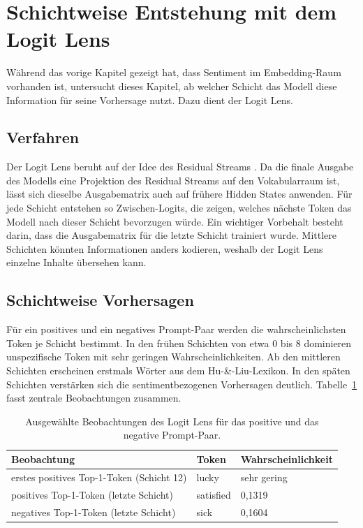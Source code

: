 \section{Schichtweise Entstehung mit dem Logit Lens}

Während das vorige Kapitel gezeigt hat, dass Sentiment im Embedding-Raum vorhanden ist, untersucht dieses Kapitel, ab welcher Schicht das Modell diese Information für seine Vorhersage nutzt. Dazu dient der Logit Lens.

\subsection{Verfahren}

Der Logit Lens beruht auf der Idee des Residual Streams \cite{nostalgebraist2020logit}. Da die finale Ausgabe des Modells eine Projektion des Residual Streams auf den Vokabularraum ist, lässt sich dieselbe Ausgabematrix auch auf frühere Hidden States anwenden. Für jede Schicht entstehen so Zwischen-Logits, die zeigen, welches nächste Token das Modell nach dieser Schicht bevorzugen würde. Ein wichtiger Vorbehalt besteht darin, dass die Ausgabematrix für die letzte Schicht trainiert wurde. Mittlere Schichten könnten Informationen anders kodieren, weshalb der Logit Lens einzelne Inhalte übersehen kann.

\subsection{Schichtweise Vorhersagen}

Für ein positives und ein negatives Prompt-Paar werden die wahrscheinlichsten Token je Schicht bestimmt. In den frühen Schichten von etwa 0 bis 8 dominieren unspezifische Token mit sehr geringen Wahrscheinlichkeiten. Ab den mittleren Schichten erscheinen erstmals Wörter aus dem Hu-\&-Liu-Lexikon. In den späten Schichten verstärken sich die sentimentbezogenen Vorhersagen deutlich. Tabelle~\ref{tab:logitlenstokens} fasst zentrale Beobachtungen zusammen.

\begin{table}[htbp]
  \centering
  \caption{Ausgewählte Beobachtungen des Logit Lens für das positive und das negative Prompt-Paar.}
  \label{tab:logitlenstokens}
  \begin{tabular}{lll}
    \toprule
    Beobachtung & Token & Wahrscheinlichkeit \\
    \midrule
    erstes positives Top-1-Token (Schicht 12) & lucky & sehr gering \\
    positives Top-1-Token (letzte Schicht) & satisfied & 0,1319 \\
    negatives Top-1-Token (letzte Schicht) & sick & 0,1604 \\
    \bottomrule
  \end{tabular}
\end{table}

